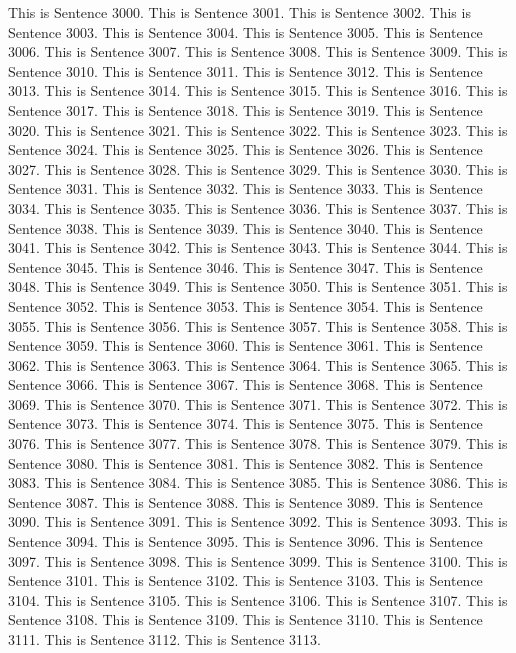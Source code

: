 \documentclass{article}
\begin{document}
This is Sentence 3000.
This is Sentence 3001.
This is Sentence 3002.
This is Sentence 3003.
This is Sentence 3004.
This is Sentence 3005.
This is Sentence 3006.
This is Sentence 3007.
This is Sentence 3008.
This is Sentence 3009.
This is Sentence 3010.
This is Sentence 3011.
This is Sentence 3012.
This is Sentence 3013.
This is Sentence 3014.
This is Sentence 3015.
This is Sentence 3016.
This is Sentence 3017.
This is Sentence 3018.
This is Sentence 3019.
This is Sentence 3020.
This is Sentence 3021.
This is Sentence 3022.
This is Sentence 3023.
This is Sentence 3024.
This is Sentence 3025.
This is Sentence 3026.
This is Sentence 3027.
This is Sentence 3028.
This is Sentence 3029.
This is Sentence 3030.
This is Sentence 3031.
This is Sentence 3032.
This is Sentence 3033.
This is Sentence 3034.
This is Sentence 3035.
This is Sentence 3036.
This is Sentence 3037.
This is Sentence 3038.
This is Sentence 3039.
This is Sentence 3040.
This is Sentence 3041.
This is Sentence 3042.
This is Sentence 3043.
This is Sentence 3044.
This is Sentence 3045.
This is Sentence 3046.
This is Sentence 3047.
This is Sentence 3048.
This is Sentence 3049.
This is Sentence 3050.
This is Sentence 3051.
This is Sentence 3052.
This is Sentence 3053.
This is Sentence 3054.
This is Sentence 3055.
This is Sentence 3056.
This is Sentence 3057.
This is Sentence 3058.
This is Sentence 3059.
This is Sentence 3060.
This is Sentence 3061.
This is Sentence 3062.
This is Sentence 3063.
This is Sentence 3064.
This is Sentence 3065.
This is Sentence 3066.
This is Sentence 3067.
This is Sentence 3068.
This is Sentence 3069.
This is Sentence 3070.
This is Sentence 3071.
This is Sentence 3072.
This is Sentence 3073.
This is Sentence 3074.
This is Sentence 3075.
This is Sentence 3076.
This is Sentence 3077.
This is Sentence 3078.
This is Sentence 3079.
This is Sentence 3080.
This is Sentence 3081.
This is Sentence 3082.
This is Sentence 3083.
This is Sentence 3084.
This is Sentence 3085.
This is Sentence 3086.
This is Sentence 3087.
This is Sentence 3088.
This is Sentence 3089.
This is Sentence 3090.
This is Sentence 3091.
This is Sentence 3092.
This is Sentence 3093.
This is Sentence 3094.
This is Sentence 3095.
This is Sentence 3096.
This is Sentence 3097.
This is Sentence 3098.
This is Sentence 3099.
This is Sentence 3100.
This is Sentence 3101.
This is Sentence 3102.
This is Sentence 3103.
This is Sentence 3104.
This is Sentence 3105.
This is Sentence 3106.
This is Sentence 3107.
This is Sentence 3108.
This is Sentence 3109.
This is Sentence 3110.
This is Sentence 3111.
This is Sentence 3112.
This is Sentence 3113.
\end{document}
